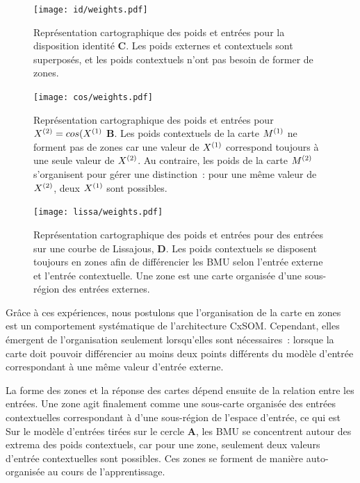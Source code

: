 \documentclass[../main]{subfiles}
\begin{document}
\begin{figure}
\begin{minipage}{\textwidth}
	\centering\texttt{[image: id/weights.pdf]}
	\vspace{-0.3cm}
	\caption{Représentation cartographique des poids et entrées pour la disposition identité \textbf{C}. Les poids externes et contextuels sont superposés, et les poids contextuels n'ont pas besoin de former de zones. \label{fig:id_results}}
	\centering\texttt{[image: cos/weights.pdf]}
	\vspace{-0.3cm}
\caption{Représentation cartographique des poids et entrées pour $X^{({2})} = cos(X^{({1})}$ \textbf{B}. Les poids contextuels de la carte $M^{({1})}$ ne forment pas de zones car une valeur de $X^{({1})}$ correspond toujours à une seule valeur de $X^{({2})}$. Au contraire, les poids de la carte $M^{({2})}$ s'organisent pour gérer une distinction~: pour une même valeur de $X^{({2})}$, deux $X^{({1})}$ sont possibles. \label{fig:cos_results}}
	\centering\texttt{[image: lissa/weights.pdf]}
	\vspace{-0.3cm}
	\caption{Représentation cartographique des poids et entrées pour des entrées sur une courbe de Lissajous, \textbf{D}.
	Les poids contextuels se disposent toujours en zones afin de différencier les BMU selon l'entrée externe et l'entrée contextuelle.
	Une zone est une carte organisée d'une sous-région des entrées externes. \label{fig:lissa}}
\end{minipage}
\end{figure}

Grâce à ces expériences, nous postulons que l'organisation de la carte en zones est un comportement systématique de l'architecture CxSOM.
Cependant, elles émergent de l'organisation seulement lorsqu'elles sont nécessaires~: lorsque la carte doit pouvoir différencier au moins deux points différents du modèle  d'entrée correspondant à une même valeur d'entrée externe.

La forme des zones et la réponse des cartes dépend ensuite de la relation entre les entrées.
Une zone agit finalement comme une sous-carte organisée des entrées contextuelles correspondant à d'une sous-région de l'espace d'entrée, ce qui est 
Sur le modèle d'entrées tirées sur le cercle \textbf{A}, les BMU se concentrent autour des extrema des poids contextuels, car pour une zone, seulement deux valeurs d'entrée contextuelles sont possibles.
Ces zones se forment de manière auto-organisée au cours de l'apprentissage.
\end{document}

